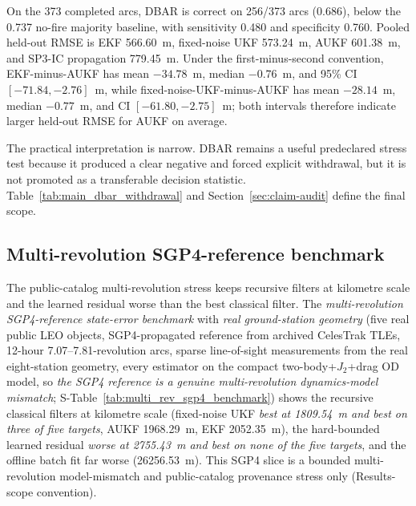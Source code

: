 \documentclass{article}
\begin{document}
On the 373 completed arcs, DBAR is correct on 256/373 arcs (0.686), below the 0.737 no-fire majority baseline, with sensitivity 0.480 and specificity 0.760. Pooled held-out RMSE is EKF 566.60~m, fixed-noise UKF 573.24~m, AUKF 601.38~m, and SP3-IC propagation 779.45~m. Under the first-minus-second convention, EKF-minus-AUKF has mean $-34.78$~m, median $-0.76$~m, and 95\% CI $[-71.84,-2.76]$~m, while fixed-noise-UKF-minus-AUKF has mean $-28.14$~m, median $-0.77$~m, and CI $[-61.80,-2.75]$~m; both intervals therefore indicate larger held-out RMSE for AUKF on average.

The practical interpretation is narrow. DBAR remains a useful predeclared stress test because it produced a clear negative and forced explicit withdrawal, but it is not promoted as a transferable decision statistic. Table~\ref{tab:main_dbar_withdrawal} and Section~\ref{sec:claim-audit} define the final scope.



\subsection{Multi-revolution SGP4-reference benchmark}
The public-catalog multi-revolution stress keeps recursive filters at kilometre scale and the learned residual worse than the best classical filter.
The \emph{multi-revolution SGP4-reference state-error benchmark} with \emph{real ground-station geometry} (five real public LEO objects, SGP4-propagated reference from archived CelesTrak TLEs, 12-hour 7.07--7.81-revolution arcs, sparse line-of-sight measurements from the real eight-station geometry, every estimator on the compact two-body+$J_2$+drag OD model, so \emph{the SGP4 reference is a genuine multi-revolution dynamics-model mismatch}; S-Table~\ref{tab:multi_rev_sgp4_benchmark}) shows the recursive classical filters at kilometre scale (fixed-noise UKF \emph{best at 1809.54~m and best on three of five targets}, AUKF 1968.29~m, EKF 2052.35~m), the hard-bounded learned residual \emph{worse at 2755.43~m and best on none of the five targets}, and the offline batch fit far worse (26256.53~m). This SGP4 slice is a bounded multi-revolution model-mismatch and public-catalog provenance stress only (Results-scope convention).
\end{document}
